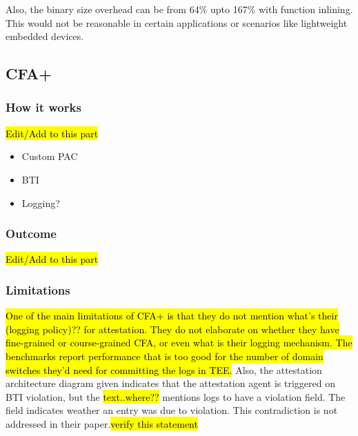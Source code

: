 \documentclass[a4paper, nobind]{templates/ociamthesis}
\providecommand{\tightlist}{%
  \setlength{\itemsep}{0pt}\setlength{\parskip}{0pt}}
\begin{document}
Also, the binary size overhead can be from 64\% upto 167\% with function inlining.
This would not be reasonable in certain applications or scenarios like lightweight embedded devices.

\subsection{CFA+}\label{cfa-1}

\subsubsection{How it works}\label{how-it-works-1}

\hl{Edit/Add to this part}

\begin{itemize}
\tightlist
\item
  Custom PAC
\item
  BTI
\item
  Logging?
\end{itemize}

\subsubsection{Outcome}\label{outcome-1}

\hl{Edit/Add to this part}

\subsubsection{Limitations}\label{limitations-1}

\hl{One of the main limitations of CFA+ is that they do not mention what's their
(logging policy)?? for attestation. They do not elaborate on whether they have
fine-grained or course-grained CFA, or even what is their logging mechanism.
The benchmarks report performance that is too good for the number of domain
switches they'd need for committing the logs in TEE.}
Also, the attestation architecture diagram given indicates that the attestation
agent is triggered on BTI violation, but the \hl{text..where??}
mentions logs to have a violation field. The field indicates weather an entry was due to violation.
This contradiction is not addressed in their paper.\hl{verify this statement}
\end{document}
